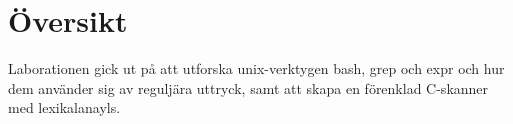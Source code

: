 \section{Översikt}
Laborationen gick ut på att utforska unix-verktygen bash, grep och expr och hur dem använder sig av reguljära uttryck, samt att skapa en förenklad C-skanner med lexikalanayls. 
